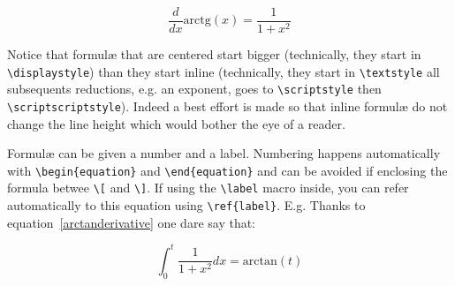 \begin{equation}  \frac{d}{dx}\mbox{arctg}(x) = \frac{1}{1+x^2} \label{arctanderivative}\end{equation}

Notice that formulæ that are centered start bigger (technically, they start in \verb+\displaystyle+) than they start inline (technically, they start in \verb+\textstyle+ all subsequents reductions, e.g. an exponent, goes to \verb+\scriptstyle+ then \verb+\scriptscriptstyle+). Indeed a best effort is made so that inline formulæ do not change the line height which would bother the eye of a reader.

Formulæ can be given a number and a label. Numbering happens automatically with \verb+\begin{equation}+ and \verb+\end{equation}+ and can be avoided if enclosing the formula betwee \verb+\[+ and \verb+\]+. If using the \verb+\label+ macro inside, you can refer automatically to this equation using \verb+\ref{label}+. E.g. Thanks to equation~\ref{arctanderivative} one dare say that:

\begin{equation} \int_0^t \frac{1}{1+x^2} dx = \mbox{arctan}(t) \end{equation}